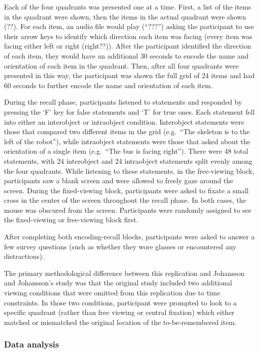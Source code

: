 \documentclass[
  english,
  man,floatsintext]{apa6}
\begin{document}
Each of the four quadrants was presented one at a time. First, a list of the items in the quadrant were shown, then the items in the actual quadrant were shown (??). For each item, an audio file would play (``???'') asking the participant to use their arrow keys to identify which direction each item was facing (every item was facing either left or right (right??)). After the participant identified the direction of each item, they would have an additional 30 seconds to encode the name and orientation of each item in the quadrant. Then, after all four quadrants were presented in this way, the participant was shown the full grid of 24 items and had 60 seconds to further encode the name and orientation of each item.

During the recall phase, participants listened to statements and responded by pressing the `F' key for false statements and `T' for true ones. Each statement fell into either an interobject or intraobject condition. Interobject statements were those that compared two different items in the grid (e.g.~``The skeleton is to the left of the robot''), while intraobject statements were those that asked about the orientation of a single item (e.g.~``The bus is facing right''). There were 48 total statements, with 24 interobject and 24 intraobject statements split evenly among the four quadrants. While listening to these statements, in the free-viewing block, participants saw a blank screen and were allowed to freely gaze around the screen. During the fixed-viewing block, participants were asked to fixate a small cross in the center of the screen throughout the recall phase. In both cases, the mouse was obscured from the screen. Participants were randomly assigned to see the fixed-viewing or free-viewing block first.

After completing both encoding-recall blocks, participants were asked to answer a few survey questions (such as whether they wore glasses or encountered any distractions).

The primary methodological difference between this replication and Johansson and Johansson's study was that the original study included two additional viewing conditions that were omitted from this replication due to time constraints. In those two conditions, participant were prompted to look to a specific quadrant (rather than free viewing or central fixation) which either matched or mismatched the original location of the to-be-remembered item.

\hypertarget{data-analysis}{%
\subsubsection{Data analysis}\label{data-analysis}}
\end{document}
